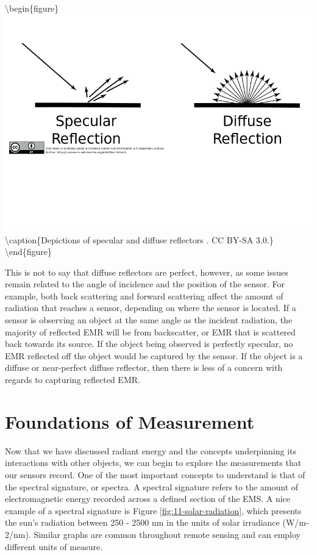 \documentclass[
]{book}
\begin{document}
\textbackslash begin\{figure\}
\includegraphics[width=0.75\linewidth,height=0.75\textheight]{images/11-reflectors} \textbackslash caption\{Depictions of specular and diffuse reflectors \citep{beck_specular_2012}. CC BY-SA 3.0.\}\label{fig:11-reflectors}
\textbackslash end\{figure\}

This is not to say that diffuse reflectors are perfect, however, as some
issues remain related to the angle of incidence and the position of the
sensor. For example, both back scattering and forward scattering affect
the amount of radiation that reaches a sensor, depending on where the
sensor is located. If a sensor is observing an object at the same angle
as the incident radiation, the majority of reflected EMR will be from
backscatter, or EMR that is scattered back towards its source. If the
object being observed is perfectly specular, no EMR reflected off the
object would be captured by the sensor. If the object is a diffuse or
near-perfect diffuse reflector, then there is less of a concern with
regards to capturing reflected EMR.

\hypertarget{foundations-of-measurement}{%
\section{Foundations of Measurement}\label{foundations-of-measurement}}

Now that we have discussed radiant energy and the concepts
underpinning its interactions with other objects, we can begin to
explore the measurements that our sensors record. One of the most
important concepts to understand is that of the spectral signature, or
spectra. A spectral signature refers to the amount of electromagnetic
energy recorded across a defined section of the EMS. A nice example
of a spectral signature is Figure \ref{fig:11-solar-radiation}, which
presents the sun's radiation between 250 - 2500 nm in the units of
solar irradiance (W/m-2/nm). Similar graphs are common throughout remote
sensing and can employ different units of measure.
\end{document}
